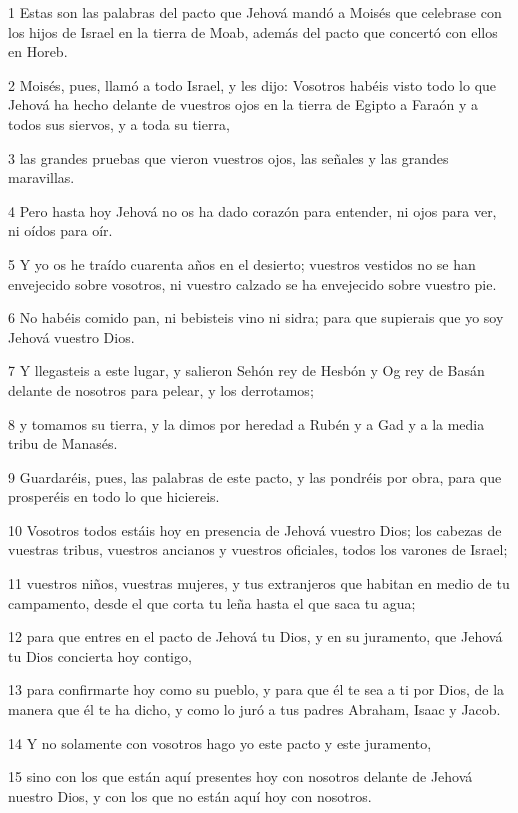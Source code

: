 \par 1 Estas son las palabras del pacto que Jehová mandó a Moisés que celebrase con los hijos de Israel en la tierra de Moab, además del pacto que concertó con ellos en Horeb.
\par 2 Moisés, pues, llamó a todo Israel, y les dijo: Vosotros habéis visto todo lo que Jehová ha hecho delante de vuestros ojos en la tierra de Egipto a Faraón y a todos sus siervos, y a toda su tierra, 
\par 3 las grandes pruebas que vieron vuestros ojos, las señales y las grandes maravillas.
\par 4 Pero hasta hoy Jehová no os ha dado corazón para entender, ni ojos para ver, ni oídos para oír.
\par 5 Y yo os he traído cuarenta años en el desierto; vuestros vestidos no se han envejecido sobre vosotros, ni vuestro calzado se ha envejecido sobre vuestro pie.
\par 6 No habéis comido pan, ni bebisteis vino ni sidra; para que supierais que yo soy Jehová vuestro Dios.
\par 7 Y llegasteis a este lugar, y salieron Sehón rey de Hesbón y Og rey de Basán delante de nosotros para pelear, y los derrotamos;
\par 8 y tomamos su tierra, y la dimos por heredad a Rubén y a Gad y a la media tribu de Manasés. 
\par 9 Guardaréis, pues, las palabras de este pacto, y las pondréis por obra, para que prosperéis en todo lo que hiciereis.
\par 10 Vosotros todos estáis hoy en presencia de Jehová vuestro Dios; los cabezas de vuestras tribus, vuestros ancianos y vuestros oficiales, todos los varones de Israel;
\par 11 vuestros niños, vuestras mujeres, y tus extranjeros que habitan en medio de tu campamento, desde el que corta tu leña hasta el que saca tu agua;
\par 12 para que entres en el pacto de Jehová tu Dios, y en su juramento, que Jehová tu Dios concierta hoy contigo,
\par 13 para confirmarte hoy como su pueblo, y para que él te sea a ti por Dios, de la manera que él te ha dicho, y como lo juró a tus padres Abraham, Isaac y Jacob.
\par 14 Y no solamente con vosotros hago yo este pacto y este juramento,
\par 15 sino con los que están aquí presentes hoy con nosotros delante de Jehová nuestro Dios, y con los que no están aquí hoy con nosotros.
